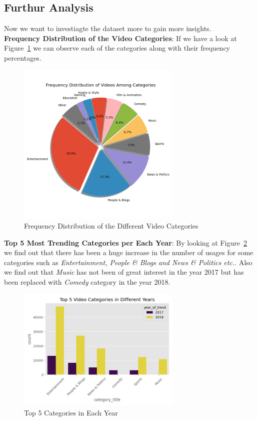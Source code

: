 \documentclass[a4paper,12pt]{article}
\begin{document}
\subsection*{Furthur Analysis} 
Now we want to investiagte the dataset more to gain more insights. \\

\noindent \textbf{Frequency Distribution of the Video Categories}: If we have a look at Figure~\ref{fig:Figure_10} we can observe each of the categories along with their frequency percentages.

\begin{figure}[H]
    \centering
    \includegraphics[width=0.7\textwidth]{./images/frequency_distribution_of_videos_among_categories.png}
    \caption{Frequency Distribution of the Different Video Categories}
    \label{fig:Figure_10}
\end{figure}


\noindent \textbf{Top 5 Most Trending Categories per Each Year}: By looking at Figure~\ref{fig:Figure_11} we find out that there has been a huge increase in the number of usages for some 
categories such as \textit{Entertainment, People \& Blogs and News \& Politics etc.}. Also we find out that \textit{Music} has not been of great interest in the year 2017 but has been replaced 
with \textit{Comedy} category in the year 2018.

\begin{figure}[H]
    \centering
    \includegraphics[width=0.7\textwidth]{./images/top_5_video_categories_in_diff_years.png}
    \caption{Top 5 Categories in Each Year}
    \label{fig:Figure_11}
\end{figure}
\end{document}
